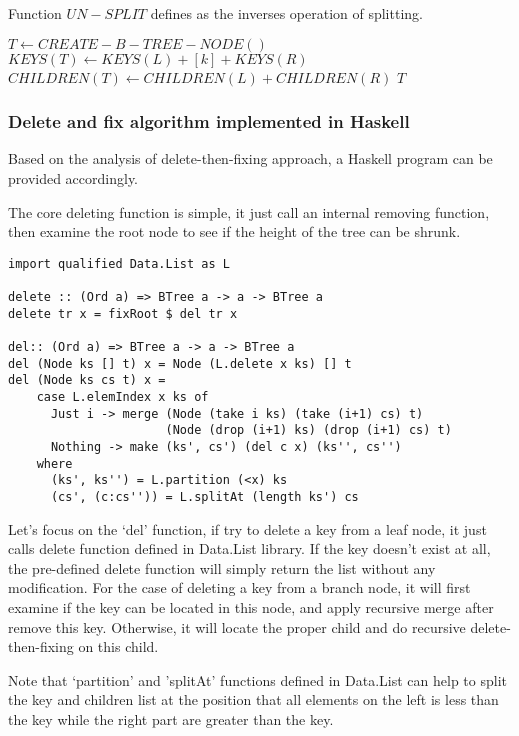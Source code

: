\documentclass{article}
\begin{document}
Function $UN-SPLIT$ defines as the inverses operation of splitting.

\begin{algorithmic}[1]
  \State $T \gets CREATE-B-TREE-NODE()$
  \State $KEYS(T) \gets KEYS(L)+[k]+KEYS(R)$
  \State $CHILDREN(T) \gets CHILDREN(L)+CHILDREN(R)$
  \State \Return $T$
\EndFunction
\end{algorithmic}

\subsubsection{Delete and fix algorithm implemented in Haskell}
Based on the analysis of delete-then-fixing approach, a Haskell
program can be provided accordingly.

The core deleting function is simple, it just call an internal
removing function, then examine the root node to see if the 
height of the tree can be shrunk.

\lstset{language=Haskell}
\begin{lstlisting}
import qualified Data.List as L

delete :: (Ord a) => BTree a -> a -> BTree a
delete tr x = fixRoot $ del tr x

del:: (Ord a) => BTree a -> a -> BTree a
del (Node ks [] t) x = Node (L.delete x ks) [] t
del (Node ks cs t) x = 
    case L.elemIndex x ks of
      Just i -> merge (Node (take i ks) (take (i+1) cs) t) 
                      (Node (drop (i+1) ks) (drop (i+1) cs) t)
      Nothing -> make (ks', cs') (del c x) (ks'', cs'')
    where
      (ks', ks'') = L.partition (<x) ks
      (cs', (c:cs'')) = L.splitAt (length ks') cs
\end{lstlisting} %

Let's focus on the `del' function, if try to delete a key from
a leaf node, it just calls delete function defined in Data.List
library. If the key doesn't exist at all, the pre-defined
delete function will simply return the list without any modification.
For the case of deleting a key from a branch node, it will first examine
if the key can be located in this node, and apply recursive merge
after remove this key. Otherwise, it will locate the proper child
and do recursive delete-then-fixing on this child.

Note that `partition' and 'splitAt' functions defined in Data.List
can help to split the key and children list at the position that
all elements on the left is less than the key while the right part
are greater than the key.
\end{document}
